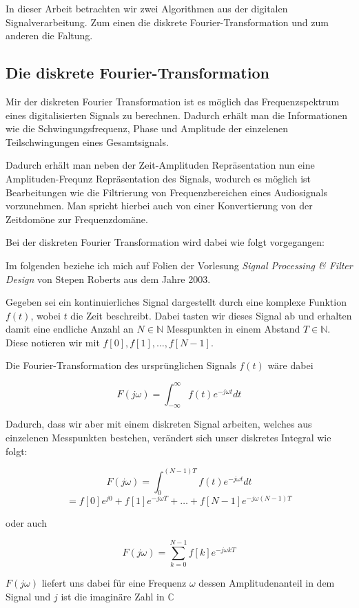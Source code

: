 \documentclass[paper=a4,fontsize=12pt,ngerman]{scrartcl}
\begin{document}
In dieser Arbeit betrachten wir zwei Algorithmen aus der digitalen Signalverarbeitung. Zum einen die diskrete Fourier-Transformation und zum anderen die Faltung.

\subsection{Die diskrete Fourier-Transformation}

Mir der diskreten Fourier Transformation ist es möglich das Frequenzspektrum eines digitalisierten Signals zu berechnen. Dadurch erhält man die Informationen wie die Schwingungsfrequenz, Phase und Amplitude der einzelenen Teilschwingungen
eines Gesamtsignals. \cite{sws1}

Dadurch erhält man neben der Zeit-Amplituden Repräsentation nun eine Amplituden-Frequnz Repräsentation des Signals, wodurch es möglich ist Bearbeitungen wie die Filtrierung von Frequenzbereichen eines Audiosignals vorzunehmen.
Man spricht hierbei auch von einer Konvertierung von der Zeitdomöne zur Frequenzdomäne.

Bei der diskreten Fourier Transformation wird dabei wie folgt vorgegangen:

Im folgenden beziehe ich mich auf Folien der Vorlesung \textit{Signal Processing \& Filter Design} von Stepen Roberts aus dem Jahre 2003.

Gegeben sei ein kontinuierliches Signal dargestellt durch eine komplexe Funktion $f(t)$, wobei $t$ die Zeit beschreibt. Dabei tasten wir dieses Signal ab und erhalten damit eine endliche Anzahl an $N \in \mathbb{N}$ Messpunkten in einem Abstand $T \in \mathbb{N}$.
Diese notieren wir mit $f[0], f[1], \dots, f[N-1]$. 

Die Fourier-Transformation des ursprünglichen Signals $f(t)$ wäre dabei 

$$F(j\omega) = \int_{-\infty}^{\infty} f(t) e^{-j \omega t} dt$$

Dadurch, dass wir aber mit einem diskreten Signal arbeiten, welches aus einzelenen Messpunkten bestehen, verändert sich unser diskretes Integral wie folgt:
    
$$F(j\omega) = \int_{0}^{(N-1)T} f(t) e^{-j \omega t} dt$$
$$= f[0]e^{j0} + f[1]e^{-j \omega T} + \dots + f[N-1]e^{-j \omega (N-1) T}$$ 

oder auch 

$$F(j \omega) = \sum_{k=0}^{N-1} f[k]e^{-j \omega k T}$$

$F(j \omega)$ liefert uns dabei für eine Frequenz $\omega$ dessen Amplitudenanteil in dem Signal und $j$ ist die imaginäre Zahl in $\mathbb{C}$
\end{document}
